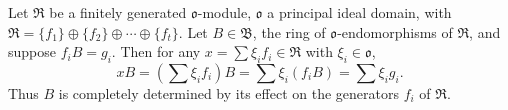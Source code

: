 Let $\mathfrak{R}$ be a finitely generated $\mathfrak{o}$-module, $\mathfrak{o}$ a principal ideal domain, with $\mathfrak{R} = \{f_1\} \oplus \{f_2\} \oplus \cdots \oplus \{f_t\}$. Let $B \in \mathfrak{B}$, the ring of $\mathfrak{o}$-endomorphisms of $\mathfrak{R}$, and suppose $f_i B = g_i$. Then for any $x = \sum \xi_i f_i \in \mathfrak{R}$ with $\xi_i \in \mathfrak{o}$,
$$
x B = \left(\sum \xi_i f_i\right) B = \sum \xi_i (f_i B) = \sum \xi_i g_i.
$$
Thus $B$ is completely determined by its effect on the generators $f_i$ of $\mathfrak{R}$.
